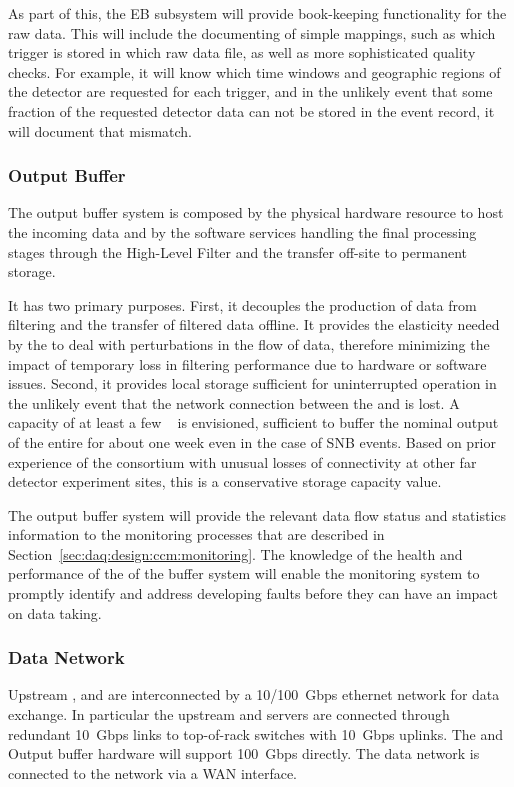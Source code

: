 
As part of this, the EB subsystem will provide book-keeping functionality for the raw data.  This will include the documenting of simple mappings, such as which trigger is stored in which raw data file, as well as more sophisticated quality checks. For example, it will know which time windows and geographic regions of the detector are requested for each trigger, and in the unlikely event that some fraction of the requested detector data can not be stored in the event record, it will document that mismatch.

\subsubsection{Output Buffer}

The output buffer system is composed by the physical hardware resource to host the incoming data and by the software services handling the final processing stages through the High-Level Filter and the transfer off-site to permanent storage.

It has two primary purposes.  First, it decouples the production of data from filtering and the
transfer of filtered data offline. It provides the elasticity needed by the  to deal with
perturbations in the flow of data, therefore minimizing the impact of temporary loss in filtering
performance due to hardware or software issues. Second, it provides local storage sufficient for
uninterrupted  operation in the unlikely event that the network connection between the
 and \fnal is lost.  A capacity of at least a few \si{\peta\byte} is envisioned,
sufficient to buffer the nominal output of the entire  for about one week even in the case of SNB events. Based on prior experience of the consortium with unusual losses of  connectivity at
other far detector experiment sites, this is a conservative storage capacity value.

The output buffer system will provide the relevant data flow status and statistics information to the monitoring processes that are described in Section~\ref{sec:daq:design:ccm:monitoring}. The knowledge of the health and performance of the of the buffer system will enable the monitoring system to promptly identify and address developing faults before they can have an impact on data taking.


\subsubsection{Data Network}
Upstream ,  and   are interconnected by a \SI{10/100}{ Gbps} ethernet network for data exchange.
In particular the upstream  and  servers are connected through redundant \SI{10}{ Gbps} links to top-of-rack switches with \SI{10}{Gbps} uplinks.
The  and Output buffer hardware will support \SI{100}{Gbps} directly.
The  data network is connected to the \fnal network via a WAN interface.

